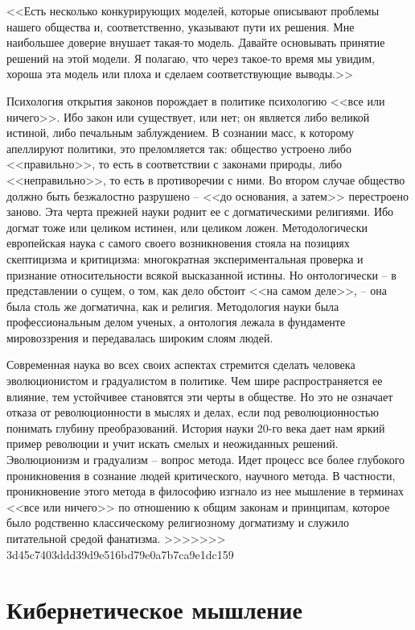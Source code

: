 \documentclass{book}
\begin{document}
<<Есть несколько конкурирующих моделей, которые описы­вают проблемы нашего общества и, соответственно, указывают пути их решения. Мне наибольшее доверие внушает такая-то модель. Давайте основывать принятие решений на этой модели. Я полагаю, что через такое-то время мы увидим, хороша эта модель или плоха и сделаем соответствующие выводы.>>

Психология открытия законов порождает в политике психологию <<все или ничего>>. Ибо закон или существует, или нет; он является либо великой истиной, либо печальным заблуждением. В сознании масс, к которому апеллируют политики, это преломляется так: общество устроено либо <<правильно>>, то есть в соответствии с законами природы, либо <<неправильно>>, то есть в противоречии с ними. Во втором случае общество должно быть безжалостно разрушено -- <<до основания, а затем>> перестроено заново. Эта черта прежней науки роднит ее с догматическими религиями. Ибо догмат тоже или целиком истинен, или целиком ложен. Методологически европейская наука с самого своего возникновения стояла на позициях скептицизма и критицизма: многократная экспериментальная проверка и признание относительности всякой высказанной истины. Но онтологически -- в представлении о сущем, о том, как дело обстоит <<на самом деле>>, -- она была столь же догматична, как и религия. Методология науки была профессиональным делом ученых, а онтология лежала в 
фундаменте мировоззрения и пе­редавалась широким слоям людей.

Современная наука во всех своих аспектах стремится сделать человека эволюционистом и градуалистом в политике. Чем шире распространяется ее влияние, тем устойчивее становятся эти черты в обществе. Но это не означает отказа от революционности в мыслях и делах, если под революционностью понимать глубину преобразований. История науки 20-го века дает нам яркий пример революции и учит искать смелых и неожиданных решений. Эволюционизм и градуализм -- вопрос метода. Идет процесс все более глубокого проникновения в сознание людей критического, научного метода. В частности, проникновение этого метода в философию изгнало из нее мышление в терминах <<все или ничего>> по отношению к общим законам и принципам, которое было родственно классическому религиозному догматизму и служило питательной средой фанатизма.
>>>>>>> 3d45c7403ddd39d9e516bd79e0a7b7ca9e1dc159

\section{Кибернетическое мышление}
\end{document}

